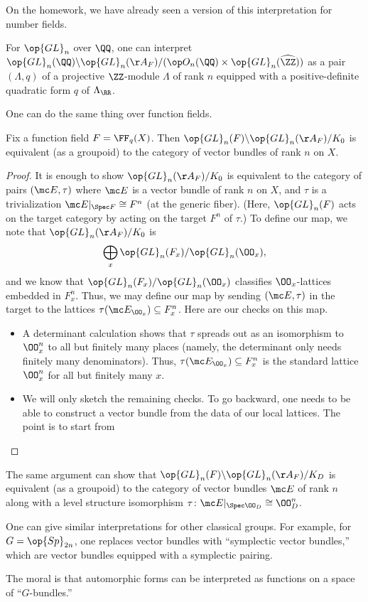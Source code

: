 \documentclass[../notes.tex]{subfiles}
\begin{document}
On the homework, we have already seen a version of this interpretation for number fields.
\begin{example}
	For $\op{GL}_n$ over $\QQ$, one can interpret $\op{GL}_n(\QQ)\backslash\op{GL}_n(\AA_F)/(\op O_n(\QQ)\times\op{GL}_n(\widehat\ZZ))$ as a pair $(\Lambda,q)$ of a projective $\ZZ$-module $\Lambda$ of rank $n$ equipped with a positive-definite quadratic form $q$ of $\Lambda_\RR$.
\end{example}
One can do the same thing over function fields.
\begin{exe} \label{exe:double-quotient-as-groupoid}
	Fix a function field $F=\FF_q(X)$. Then $\op{GL}_n(F)\backslash\op{GL}_n(\AA_F)/K_0$ is equivalent (as a groupoid) to the category of vector bundles of rank $n$ on $X$.
\end{exe}
\begin{proof}
	It is enough to show $\op{GL}_n(\AA_F)/K_0$ is equivalent to the category of pairs $(\mc E,\tau)$ where $\mc E$ is a vector bundle of rank $n$ on $X$, and $\tau$ is a trivialization $\mc E|_{\Spec F}\cong F^n$ (at the generic fiber). (Here, $\op{GL}_n(F)$ acts on the target category by acting on the target $F^n$ of $\tau$.) To define our map, we note that $\op{GL}_n(\AA_F)/K_0$ is
	\[\bigoplus_x\op{GL}_n(F_x)/\op{GL}_n(\OO_x),\]
	and we know that $\op{GL}_n(F_x)/\op{GL}_n(\OO_x)$ classifies $\OO_x$-lattices embedded in $F_x^n$. Thus, we may define our map by sending $(\mc E,\tau)$ in the target to the lattices $\tau(\mc E_{\OO_x})\subseteq F_x^n$. Here are our checks on this map.
	\begin{itemize}
		\item A determinant calculation shows that $\tau$ spreads out as an isomorphism to $\OO_x^n$ to all but finitely many places (namely, the determinant only needs finitely many denominators). Thus, $\tau(\mc E_{\OO_x})\subseteq F_x^n$ is the standard lattice $\OO_x^n$ for all but finitely many $x$.
		\item We will only sketch the remaining checks.  To go backward, one needs to be able to construct a vector bundle from the data of our local lattices. The point is to start from 
		\qedhere
	\end{itemize}
\end{proof}
\begin{remark}
	The same argument can show that $\op{GL}_n(F)\backslash\op{GL}_n(\AA_F)/K_D$ is equivalent (as a groupoid) to the category of vector bundles $\mc E$ of rank $n$ along with a level structure isomorphism $\tau\colon\mc E|_{\Spec\OO_D}\cong\OO_D^n$.
\end{remark}
\begin{remark}
	One can give similar interpretations for other classical groups. For example, for $G=\op{Sp}_{2n}$, one replaces vector bundles with ``symplectic vector bundles,'' which are vector bundles equipped with a symplectic pairing.
\end{remark}
The moral is that automorphic forms can be interpreted as functions on a space of ``$G$-bundles.''
\end{document}
